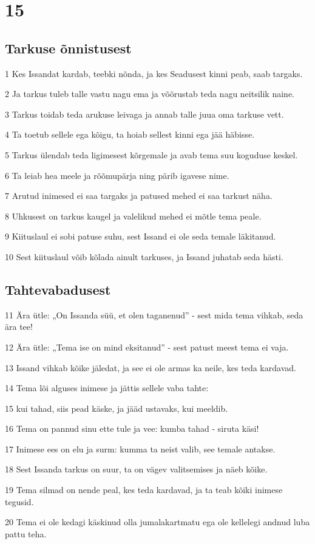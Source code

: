 \chapter{15}

\section*{Tarkuse õnnistusest}

\par 1 Kes Issandat kardab, teebki nõnda, ja kes Seadusest kinni peab, saab targaks.
\par 2 Ja tarkus tuleb talle vastu nagu ema ja võõrustab teda nagu neitsilik naine.
\par 3 Tarkus toidab teda arukuse leivaga ja annab talle juua oma tarkuse vett.
\par 4 Ta toetub sellele ega kõigu, ta hoiab sellest kinni ega jää häbisse.
\par 5 Tarkus ülendab teda ligimesest kõrgemale ja avab tema suu koguduse keskel.
\par 6 Ta leiab hea meele ja rõõmupärja ning pärib igavese nime.
\par 7 Arutud inimesed ei saa targaks ja patused mehed ei saa tarkust näha.
\par 8 Uhkusest on tarkus kaugel ja valelikud mehed ei mõtle tema peale.
\par 9 Kiituslaul ei sobi patuse suhu, sest Issand ei ole seda temale läkitanud.
\par 10 Sest kiituslaul võib kõlada ainult tarkuses, ja Issand juhatab seda hästi.

\section*{Tahtevabadusest}

\par 11 Ära ütle: „On Issanda süü, et olen taganenud” - sest mida tema vihkab, seda ära tee!
\par 12 Ära ütle: „Tema ise on mind eksitanud” - sest patust meest tema ei vaja.
\par 13 Issand vihkab kõike jäledat, ja see ei ole armas ka neile, kes teda kardavad.
\par 14 Tema lõi alguses inimese ja jättis sellele vaba tahte:
\par 15 kui tahad, siis pead käske, ja jääd ustavaks, kui meeldib.
\par 16 Tema on pannud sinu ette tule ja vee: kumba tahad - siruta käsi!
\par 17 Inimese ees on elu ja surm: kumma ta neist valib, see temale antakse.
\par 18 Sest Issanda tarkus on suur, ta on vägev valitsemises ja näeb kõike.
\par 19 Tema silmad on nende peal, kes teda kardavad, ja ta teab kõiki inimese tegusid.
\par 20 Tema ei ole kedagi käskinud olla jumalakartmatu ega ole kellelegi andnud luba pattu teha.

